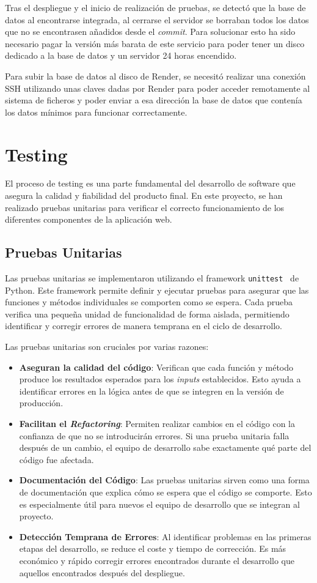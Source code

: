 Tras el despliegue y el inicio de realización de pruebas, se detectó que la base de datos al encontrarse integrada, al cerrarse el servidor se borraban todos los datos que no se encontrasen añadidos desde el \textit{commit}. Para solucionar esto ha sido necesario pagar la versión más barata de este servicio para poder tener un disco dedicado a la base de datos y un servidor 24 horas encendido. 

Para subir la base de datos al disco de Render, se necesitó realizar una conexión SSH utilizando unas claves dadas por Render para poder acceder remotamente al sistema de ficheros y poder enviar a esa dirección la base de datos que contenía los datos mínimos para funcionar correctamente.


\section{Testing}
El proceso de testing es una parte fundamental del desarrollo de software que asegura la calidad y fiabilidad del producto final. En este proyecto, se han realizado pruebas unitarias para verificar el correcto funcionamiento de los diferentes componentes de la aplicación web.

\subsection{Pruebas Unitarias}
Las pruebas unitarias se implementaron utilizando el framework \texttt{unittest}~\cite{Unittest} de Python. Este framework permite definir y ejecutar pruebas para asegurar que las funciones y métodos individuales se comporten como se espera. Cada prueba verifica una pequeña unidad de funcionalidad de forma aislada, permitiendo identificar y corregir errores de manera temprana en el ciclo de desarrollo.

Las pruebas unitarias son cruciales por varias razones:
\begin{itemize}
    \item \textbf{Aseguran la calidad del código}: Verifican que cada función y método produce los resultados esperados para los \textit{inputs} establecidos. Esto ayuda a identificar errores en la lógica antes de que se integren en la versión de producción.
    \item \textbf{Facilitan el \textit{Refactoring}}: Permiten realizar cambios en el código con la confianza de que no se introducirán errores. Si una prueba unitaria falla después de un cambio, el equipo de desarrollo sabe exactamente qué parte del código fue afectada.
    \item \textbf{Documentación del Código}: Las pruebas unitarias sirven como una forma de documentación que explica cómo se espera que el código se comporte. Esto es especialmente útil para nuevos el equipo de desarrollo que se integran al proyecto.
    \item \textbf{Detección Temprana de Errores}: Al identificar problemas en las primeras etapas del desarrollo, se reduce el coste y tiempo de corrección. Es más económico y rápido corregir errores encontrados durante el desarrollo que aquellos encontrados después del despliegue.
\end{itemize}

